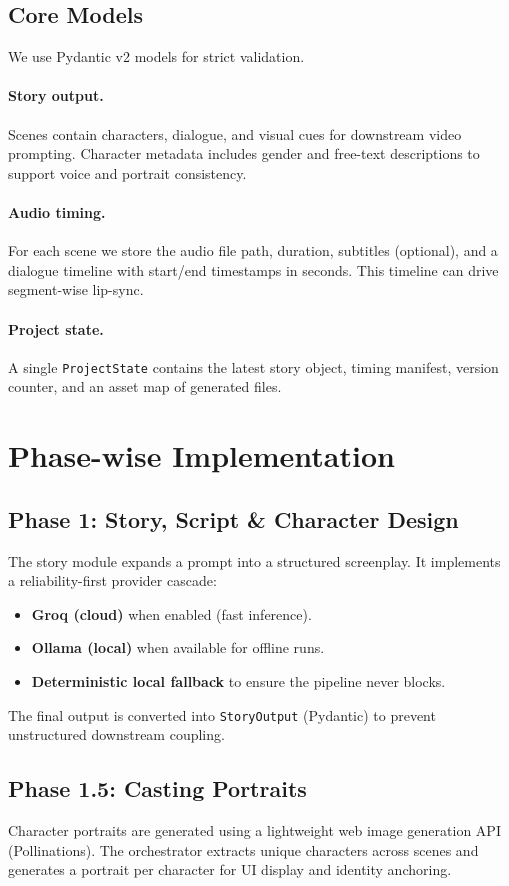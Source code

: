 \documentclass[runningheads]{llncs}
\begin{document}
\subsection{Core Models}
We use Pydantic v2 models for strict validation.

\paragraph{Story output.} Scenes contain characters, dialogue, and visual cues for downstream video prompting. Character metadata includes gender and free-text descriptions to support voice and portrait consistency.

\paragraph{Audio timing.} For each scene we store the audio file path, duration, subtitles (optional), and a dialogue timeline with start/end timestamps in seconds. This timeline can drive segment-wise lip-sync.

\paragraph{Project state.} A single \texttt{ProjectState} contains the latest story object, timing manifest, version counter, and an asset map of generated files.

\section{Phase-wise Implementation}
\subsection{Phase 1: Story, Script \& Character Design}
The story module expands a prompt into a structured screenplay. It implements a reliability-first provider cascade:
\begin{itemize}
  \item \textbf{Groq (cloud)} when enabled (fast inference).
  \item \textbf{Ollama (local)} when available for offline runs.
  \item \textbf{Deterministic local fallback} to ensure the pipeline never blocks.
\end{itemize}
The final output is converted into \texttt{StoryOutput} (Pydantic) to prevent unstructured downstream coupling.

\subsection{Phase 1.5: Casting Portraits}
Character portraits are generated using a lightweight web image generation API (Pollinations). The orchestrator extracts unique characters across scenes and generates a portrait per character for UI display and identity anchoring.
\end{document}
